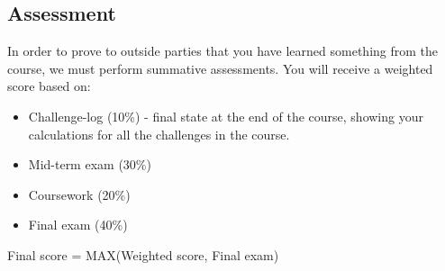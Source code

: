 \subsection{Assessment}
In order to prove to outside parties that you have learned something from the course, we must perform summative assessments. You will receive a weighted score based on:

\begin{itemize}
    \item Challenge-log (10\%) - final state at the end of the course, showing your calculations for all the challenges in the course.
    \item Mid-term exam (30\%)
    \item Coursework (20\%)
    \item Final exam (40\%)
\end{itemize}

Final score = MAX(Weighted score, Final exam)
